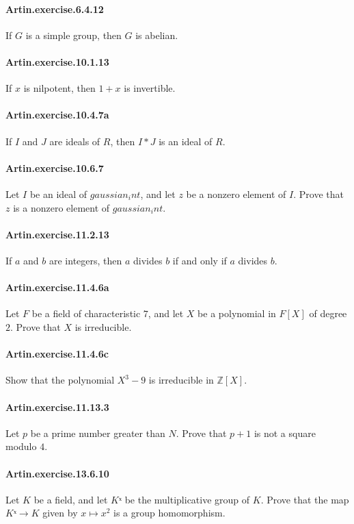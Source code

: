 \documentclass{article}
\begin{document}
\paragraph{Artin.exercise.6.4.12} If $G$ is a simple group, then $G$ is abelian.

\paragraph{Artin.exercise.10.1.13} If $x$ is nilpotent, then $1 + x$ is invertible.

\paragraph{Artin.exercise.10.4.7a} If $I$ and $J$ are ideals of $R$, then $I * J$ is an ideal of $R$.

\paragraph{Artin.exercise.10.6.7} Let $I$ be an ideal of $gaussian_int$, and let $z$ be a nonzero element of $I$. Prove that $z$ is a nonzero element of $gaussian_int$.

\paragraph{Artin.exercise.11.2.13} If $a$ and $b$ are integers, then $a$ divides $b$ if and only if $a$ divides $b$.

\paragraph{Artin.exercise.11.4.6a} Let $F$ be a field of characteristic $7$, and let $X$ be a polynomial in $F[X]$ of degree $2$. Prove that $X$ is irreducible.

\paragraph{Artin.exercise.11.4.6c} Show that the polynomial $X^3 - 9$ is irreducible in $\mathbb{Z}[X]$.

\paragraph{Artin.exercise.11.13.3} Let $p$ be a prime number greater than $N$. Prove that $p + 1$ is not a square modulo $4$.

\paragraph{Artin.exercise.13.6.10} Let $K$ be a field, and let $Kˣ$ be the multiplicative group of $K$. Prove that the map $Kˣ → K$ given by $x \mapsto x^2$ is a group homomorphism.
\end{document}
